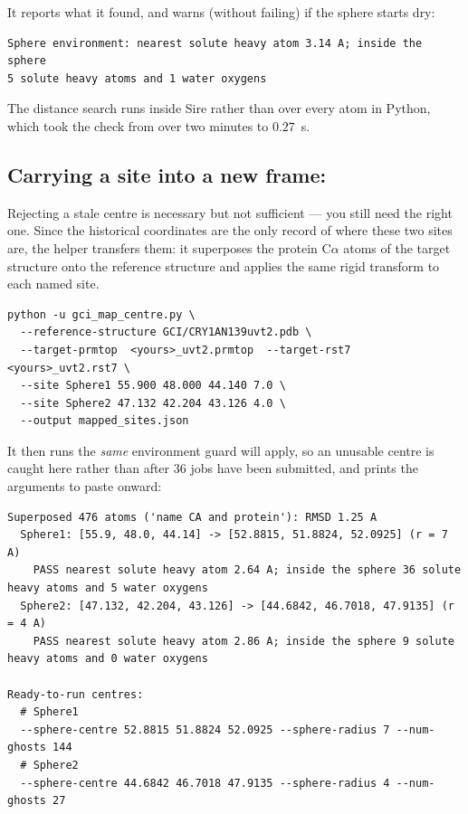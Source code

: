 \documentclass[11pt]{article}
\newcommand{\file}[1]{\texttt{\detokenize{#1}}}
\begin{document}
It reports what it found, and warns (without failing) if the sphere starts dry:

\begin{lstlisting}
Sphere environment: nearest solute heavy atom 3.14 A; inside the sphere
5 solute heavy atoms and 1 water oxygens
\end{lstlisting}

The distance search runs inside Sire rather than over every atom in Python, which took the
check from over two minutes to $0.27$~s.

\subsection*{Carrying a site into a new frame: \file{gci_map_centre.py}}

Rejecting a stale centre is necessary but not sufficient --- you still need the right one.
Since the historical coordinates are the only record of where these two sites are, the
helper transfers them: it superposes the protein C$\alpha$ atoms of the target structure onto
the reference structure and applies the same rigid transform to each named site.

\begin{lstlisting}
python -u gci_map_centre.py \
  --reference-structure GCI/CRY1AN139uvt2.pdb \
  --target-prmtop  <yours>_uvt2.prmtop  --target-rst7 <yours>_uvt2.rst7 \
  --site Sphere1 55.900 48.000 44.140 7.0 \
  --site Sphere2 47.132 42.204 43.126 4.0 \
  --output mapped_sites.json
\end{lstlisting}

It then runs the \emph{same} environment guard \file{gci_window.py} will apply, so an
unusable centre is caught here rather than after 36 jobs have been submitted, and prints the
arguments to paste onward:

\begin{lstlisting}
Superposed 476 atoms ('name CA and protein'): RMSD 1.25 A
  Sphere1: [55.9, 48.0, 44.14] -> [52.8815, 51.8824, 52.0925] (r = 7 A)
    PASS nearest solute heavy atom 2.64 A; inside the sphere 36 solute heavy atoms and 5 water oxygens
  Sphere2: [47.132, 42.204, 43.126] -> [44.6842, 46.7018, 47.9135] (r = 4 A)
    PASS nearest solute heavy atom 2.86 A; inside the sphere 9 solute heavy atoms and 0 water oxygens

Ready-to-run centres:
  # Sphere1
  --sphere-centre 52.8815 51.8824 52.0925 --sphere-radius 7 --num-ghosts 144
  # Sphere2
  --sphere-centre 44.6842 46.7018 47.9135 --sphere-radius 4 --num-ghosts 27
\end{lstlisting}
\end{document}
